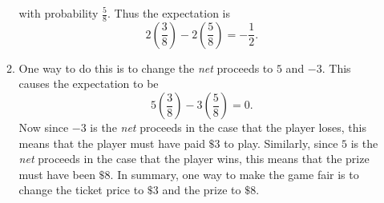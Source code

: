 \documentclass[12pt]{article}
\begin{document}
\begin{enumerate}
\begin{enumerate}
with probability $\frac{5}{8}$. Thus the expectation is
\[2\left(\frac{3}{8}\right)-2\left(\frac{5}{8}\right)=-\frac{1}{2}.\]
\item One way to do this is to change the {\em net} proceeds
to $5$ and $-3$. This causes the expectation to be
\[5\left(\frac{3}{8}\right)-3\left(\frac{5}{8}\right)=0.\]
Now since $-3$ is the {\em net} proceeds in the case that the player loses,
this means that the player must have paid $\$3$ to play.
Similarly, since $5$ is the {\em net} proceeds in the case that the player 
wins, this means that the prize must have been $\$8$.
In summary, one way to make the game fair is to change the ticket price
to $\$3$ and the prize to $\$8$.
\end{enumerate}
\end{enumerate}
\end{document}
